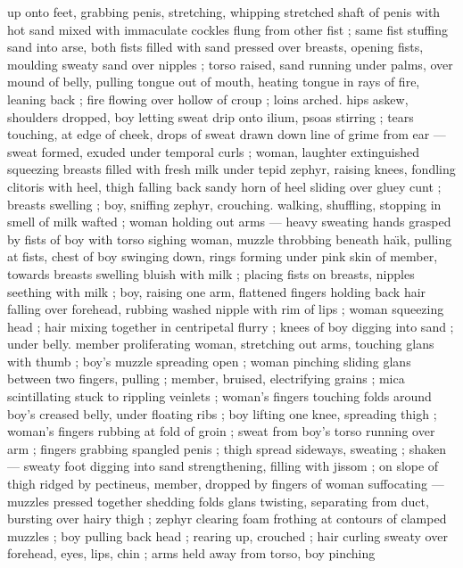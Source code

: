 up onto feet, grabbing penis, stretching, whipping stretched shaft of 
penis with hot sand mixed with immaculate cockles flung from other 
fist ; same fist stuffing sand into arse, both fists filled with sand 
pressed over breasts, opening fists, moulding sweaty sand over 
nipples ; torso raised, sand running under palms, over mound of 
belly, pulling tongue out of mouth, heating tongue in rays of fire, 
leaning back ; fire flowing over hollow of croup ; loins arched. hips 
askew, shoulders dropped, boy letting sweat drip onto ilium, psoas 
stirring ; tears touching, at edge of cheek, drops of sweat drawn 
down line of grime from ear --- sweat formed, exuded under 
temporal curls ; woman, laughter extinguished squeezing breasts 
filled with fresh milk under tepid zephyr, raising knees, fondling 
clitoris with heel, thigh falling back {\col} sandy horn of heel sliding over 
gluey cunt ; breasts swelling ; boy, sniffing zephyr, crouching. 
walking, shuffling, stopping in smell of milk wafted ; woman holding 
out arms --- heavy sweating hands grasped by fists of boy with torso 
sighing {\col} woman, muzzle throbbing beneath ha\"{\i}k, pulling at fists, 
chest of boy swinging down, rings forming under pink skin of 
member, towards breasts swelling bluish with milk ; placing fists on 
breasts, nipples seething with milk ; boy, raising one arm, flattened 
fingers holding back hair falling over forehead, rubbing washed 
nipple with rim of lips ; woman squeezing head ; hair mixing together 
in centripetal flurry ; knees of boy digging into sand ; under belly. 
member proliferating {\col} woman, stretching out arms, touching glans 
with thumb ; boy's muzzle spreading open ; woman pinching sliding 
glans between two fingers, pulling ; member, bruised, electrifying 
grains ; mica scintillating stuck to rippling veinlets ; woman's fingers 
touching folds around boy's creased belly, under floating ribs ; boy 
lifting one knee, spreading thigh ; woman's fingers rubbing at fold of 
groin ; sweat from boy's torso running over arm ; fingers grabbing 
spangled penis ; thigh spread sideways, sweating ; shaken --- sweaty 
foot digging into sand {\dashcom} strengthening, filling with jissom ; on 
slope of thigh ridged by pectineus, member, dropped by fingers of 
woman suffocating --- muzzles pressed together {\dashcom} shedding folds 
{\col} glans twisting, separating from duct, bursting over hairy thigh ;
zephyr clearing foam frothing at contours of clamped muzzles ; boy 
pulling back head ; rearing up, crouched ; hair curling sweaty over 
forehead, eyes, lips, chin ; arms held away from torso, boy pinching 
